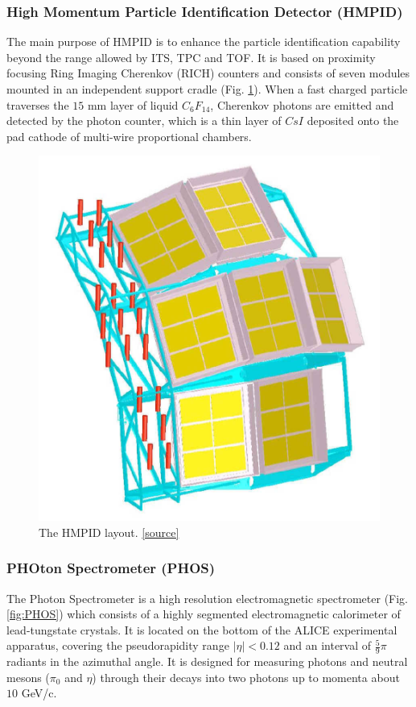 \subsubsection{High Momentum Particle Identification Detector (HMPID)}
The main purpose of HMPID is to enhance the particle identification capability beyond the range allowed by ITS, TPC and TOF. 
It is based on proximity focusing Ring Imaging Cherenkov (RICH) counters and consists of seven modules mounted in an independent support cradle (Fig. \ref{fig:HMPID}). 
When a fast charged particle traverses the $15$ mm layer of liquid $C_6F_{14}$, Cherenkov photons are emitted and detected by the photon counter, which is a thin layer of $CsI$ deposited onto the pad cathode of multi-wire proportional chambers.

\begin{figure}[!h]
\begin{center}
\includegraphics[width=0.4\linewidth]{Chapters/Introduction/Figs/hmpid.pdf}
\caption{The HMPID layout. \href{http://alice.web.cern.ch/detectors/more-details-alice-hmpid}{[source]}}
\label{fig:HMPID}
\end{center}
\end{figure}

\subsubsection{PHOton Spectrometer (PHOS)}
The Photon Spectrometer is a high resolution electromagnetic spectrometer (Fig. \ref{fig:PHOS}) which consists of a highly segmented electromagnetic calorimeter of lead-tungstate crystals.
It is located on the bottom of the ALICE experimental apparatus, covering the pseudorapidity range $|\eta| < 0.12$ and an interval of $\frac{5}{9}\pi$ radiants in the azimuthal angle.
It is designed for measuring photons and neutral mesons ($\pi_0$ and $\eta$) through their decays into two photons up to momenta about $10$ GeV/c.

